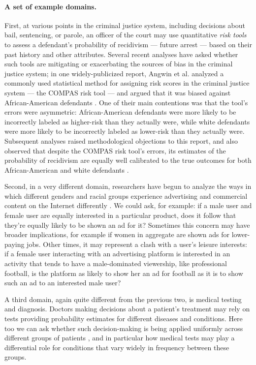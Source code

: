 \documentclass[11pt]{article}
\newcommand{\xhdr}[1]{\vspace{-0.2in} \paragraph*{\bf {#1}.}}
\begin{document}
\xhdr{A set of example domains}
First, at various points in the criminal justice system, including
decisions about bail, sentencing, or parole, an officer of the court
may use quantitative {\em risk tools} to assess a defendant's probability
of recidivism --- future arrest --- based on their past history 
and other attributes.
Several recent analyses have asked whether such tools are mitigating or
exacerbating the sources of bias in the criminal justice system;
in one widely-publicized report, Angwin et al.
analyzed a commonly used statistical method for assigning risk
scores in the criminal justice system --- the COMPAS risk tool ---
and argued that it was biased against African-American defendants 
\cite{angwin-propublica-risk-scores,larson-angwin-propublica-analysis}.
One of their main contentions was that the tool's errors were asymmetric:
African-American defendants were more likely to be incorrectly labeled as
higher-risk than they actually were, while white defendants were more 
likely to be incorrectly labeled as lower-risk than they actually were.
Subsequent analyses raised methodological objections to this report,
and also observed that despite the COMPAS risk 
tool's errors, its estimates of the probability of recidivism are equally
well calibrated to the true outcomes for both African-American
and white defendants
\cite{propublica-analysis-doc,dieterich-northpointe-fairness,flores-re-propublica-fair,gong-algorithm-ethics-pt1}.

Second, in a very different domain, researchers have begun to analyze
the ways in which different genders and racial groups experience 
advertising and commercial content on the Internet differently
\cite{datta-google-ad-targeting,sweeney-google-ad-discrimination}.
We could ask, for example: if a male user and female user are 
equally interested in a particular product, does it follow that they're
equally likely to be shown an ad for it?
Sometimes this concern may have broader implications, for example if
women in aggregate are shown ads for lower-paying jobs.
Other times, it may represent a clash with a user's leisure interests:
if a female user interacting with an advertising platform
is interested in an activity that tends to have a male-dominated viewership,
like professional football,
is the platform as likely to show her an ad
for football as it is to show such an ad to an interested male user?

A third domain, again quite different from the previous two, is 
medical testing and diagnosis.
Doctors making decisions about a patient's treatment may rely on
tests providing probability estimates for different diseases and conditions.
Here too we can ask whether such decision-making is being applied
uniformly across different groups of patients
\cite{garb-medical-bias,williams-medical-discrimination}, and
in particular how medical tests may play a differential role for
conditions that vary widely in frequency between these groups.
\end{document}
